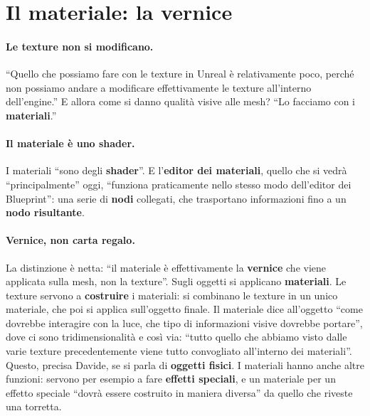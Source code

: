 \section{Il materiale: la vernice}
\label{ue3:sec:materiale}

\paragraph{Le texture non si modificano.} ``Quello che possiamo fare con le texture in
Unreal è relativamente poco, perché non possiamo andare a modificare effettivamente le
texture all'interno dell'engine.'' E allora come si danno qualità visive alle mesh?
``Lo facciamo con i \textbf{materiali}.''

\paragraph{Il materiale è uno shader.} I materiali ``sono degli \textbf{shader}''. E
l'\textbf{editor dei materiali}, quello che si vedrà ``principalmente'' oggi, ``funziona
praticamente nello stesso modo dell'editor dei Blueprint'': una serie di \textbf{nodi}
collegati, che trasportano informazioni fino a un \textbf{nodo risultante}.

\paragraph{Vernice, non carta regalo.} La distinzione è netta: ``il materiale è
effettivamente la \textbf{vernice} che viene applicata sulla mesh, non la texture''. Sugli
oggetti si applicano \textbf{materiali}. Le texture servono a \textbf{costruire} i
materiali: si combinano le texture in un unico materiale, che poi si applica
sull'oggetto finale. Il materiale dice all'oggetto ``come dovrebbe interagire con la
luce, che tipo di informazioni visive dovrebbe portare'', dove ci sono
tridimensionalità e così via: ``tutto quello che abbiamo visto dalle varie texture
precedentemente viene tutto convogliato all'interno dei materiali''. Questo, precisa
Davide, se si parla di \textbf{oggetti fisici}. I materiali hanno anche altre funzioni:
servono per esempio a fare \textbf{effetti speciali}, e un materiale per un effetto
speciale ``dovrà essere costruito in maniera diversa'' da quello che riveste una
torretta.


